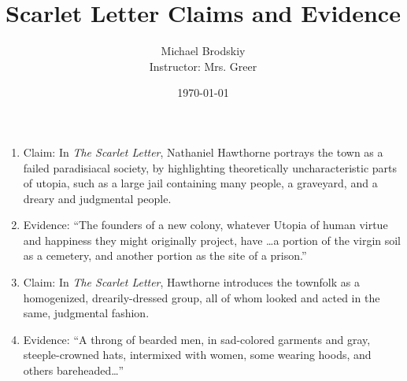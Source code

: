 \documentclass[12pt]{article}
\title{Scarlet Letter Claims and Evidence}
\date{\today}
\author{Michael Brodskiy\\ \small Instructor: Mrs. Greer}
\begin{document}
\maketitle

\begin{enumerate}

  \item Claim: In \textit{The Scarlet Letter}, Nathaniel Hawthorne portrays the town as a failed paradisiacal society, by highlighting theoretically uncharacteristic parts of utopia, such as a large jail containing many people, a graveyard, and a dreary and judgmental people.
    
    \setcounter{enumi}{0}

  \item Evidence: ``The founders of a new colony, whatever Utopia of human virtue and happiness they might originally project, have \dots a portion of the virgin soil as a cemetery, and another portion as the site of a prison.''

  \item Claim: In \textit{The Scarlet Letter}, Hawthorne introduces the townfolk as a homogenized, drearily-dressed group, all of whom looked and acted in the same, judgmental fashion.

    \setcounter{enumi}{1}

  \item Evidence: ``A throng of bearded men, in sad-colored garments and gray, steeple-crowned hats, intermixed with women, some wearing hoods, and others bareheaded\dots''

\end{enumerate}
\end{document}
